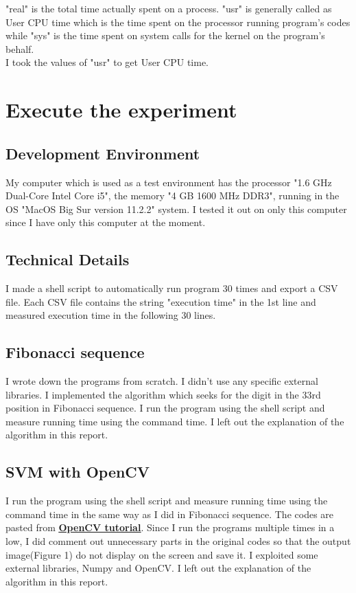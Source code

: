 \documentclass[11pt, a4paper]{article}
\begin{document}
"real" is the total time actually spent on a process. "usr" is generally called as User CPU time which is the time spent on the processor running program's codes while "sys" is the time spent on system calls for the kernel on the program's behalf. \\

I took the values of "usr" to get User CPU time.

\section{Execute the experiment}
\subsection{Development Environment}
My computer which is used as a test environment has the processor "1.6 GHz Dual-Core Intel Core i5", the memory "4 GB 1600 MHz DDR3", running in the OS "MacOS Big Sur version 11.2.2" system. I tested it out on only this computer since I have only this computer at the moment.
\subsection{Technical Details}
I made a shell script to automatically run program 30 times and export a CSV file. Each CSV file contains the string "execution time" in the 1st line and measured execution time in the following 30 lines. 

\subsection{Fibonacci sequence}
I wrote down the programs from scratch. I didn't use any specific external libraries. I implemented the algorithm which seeks for the digit in the 33rd position in Fibonacci sequence. I run the program using the shell script and measure running time using the command time. I left out the explanation of the algorithm in this report.

\subsection{SVM with OpenCV}
I run the program using the shell script and measure running time using the command time in the same way as I did in Fibonacci sequence. The codes are pasted from \href{https://docs.opencv.org/master/d1/d73/tutorial_introduction_to_svm.html}{\underline{\bf{OpenCV tutorial}}}. Since I run the programs multiple times in a low, I did comment out unnecessary parts in the original codes so that the output image(Figure 1) do not display on the screen and save it. I exploited some external libraries, Numpy and OpenCV. I left out the explanation of the algorithm in this report.
\end{document}
